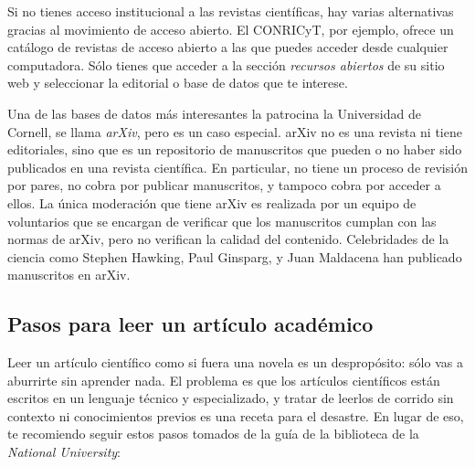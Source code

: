 Si no tienes acceso institucional a las revistas científicas, hay varias
alternativas gracias al movimiento de acceso abierto.
El CONRICyT, por ejemplo, ofrece un catálogo de
revistas de acceso abierto a las que puedes acceder desde cualquier computadora.
Sólo tienes que acceder a la sección \emph{recursos abiertos} de su sitio web y
seleccionar la editorial o base de datos que te interese.

Una de las bases de datos más interesantes la patrocina la Universidad de
Cornell, se llama \emph{arXiv}, pero es un caso
especial.
arXiv no es una revista ni tiene editoriales, sino que  es un repositorio de
manuscritos que pueden o no haber sido publicados en una revista científica.
En particular, no tiene un proceso de revisión por pares, no cobra por publicar
manuscritos, y tampoco cobra por acceder a ellos.
La única moderación que tiene arXiv es realizada por un equipo de voluntarios
que se encargan de verificar que los manuscritos cumplan con las normas de
arXiv, pero no verifican la calidad del contenido.
Celebridades de la ciencia como Stephen Hawking, Paul Ginsparg, y Juan Maldacena
han publicado manuscritos en arXiv.

\subsection*{Pasos para leer un artículo académico}

Leer un artículo científico como si fuera una novela es un despropósito: sólo
vas a aburrirte sin aprender nada.
El problema es que los artículos científicos están escritos en un lenguaje
técnico y especializado, y tratar de leerlos de corrido sin contexto ni
conocimientos previos es una receta para el desastre.
En lugar de eso, te recomiendo seguir estos pasos tomados de la guía de la
biblioteca de la \emph{National University}\cite{NationalUniversity2024}:

